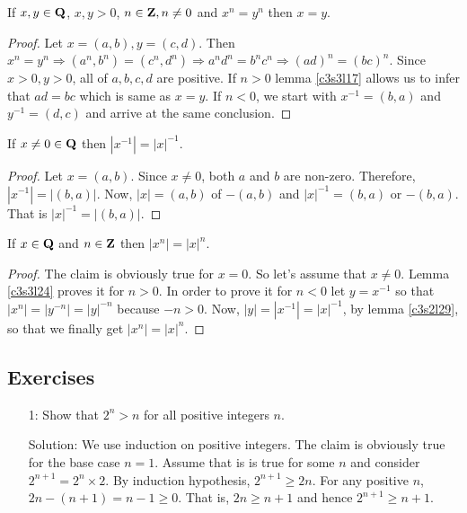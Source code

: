 \begin{lem}\label{c3s3l28}
If $x, y \in \mathbf{Q}$, $x, y > 0$, $n \in \mathbf{Z}, n \ne 0$ and $x^n = y^n$
then $x = y$.
\end{lem}
\begin{proof}
Let $x = (a, b), y = (c, d)$. Then $x^n = y^n \Rightarrow (a^n, b^n) = 
(c^n, d^n) \Rightarrow a^nd^n = b^nc^n \Rightarrow (ad)^n = (bc)^n$. Since
$x > 0, y > 0$, all of $a, b, c, d$ are positive. If $n>0$ lemma 
\ref{c3s3l17} allows us to infer that $ad = bc$ which is same as $x = y$.
If $n < 0$, we start with $x^{-1} = (b, a)$ and $y^{-1} = (d, c)$ and
arrive at the same conclusion.
\end{proof}

\begin{lem}\label{c3s2l29}
If $x \ne 0 \in \mathbf{Q}$ then $|x^{-1}| = |x|^{-1}$.
\end{lem}
\begin{proof}
Let $x = (a, b)$. Since $x \ne 0$, both $a$ and $b$ are non-zero. 
Therefore, $|x^{-1}| = |(b, a)|$. Now, $|x| = (a, b)$ of $-(a, b)$ and
$|x|^{-1} = (b, a)$ or $-(b, a)$. That is $|x|^{-1} = |(b, a)|$.
\end{proof}

\begin{lem}\label{c3s2l30}
If $x \in \mathbf{Q}$ and $n \in \mathbf{Z}$ then $|x^n| = |x|^n$.
\end{lem}
\begin{proof}
The claim is obviously true for $x = 0$. So let's assume that $x \ne 0$.
Lemma \ref{c3s3l24} proves it for $n > 0$. In order to prove it for $n<0$
let $y = x^{-1}$ so that $|x^{n}| = |y^{-n}| = |y|^{-n}$ because $-n > 0$.
Now, $|y| = |x^{-1}| = |x|^{-1}$, by lemma \ref{c3s2l29}, so that we 
finally get $|x^{n}| = |x|^n$.
\end{proof}

\subsection{Exercises}
\begin{enumerate}
\item[1:] Show that $2^n > n$ for all positive integers $n$.
\item[Solution:] We use induction on positive integers. The claim is
obviously true for the base case $n=1$. Assume that is is true for some
$n$ and consider $2^{n+1} = 2^n \times 2$. By induction hypothesis, 
$2^{n+1} \ge 2n$. For any positive $n$, $2n - (n + 1) = n - 1 \ge 0$. 
That is, $2n \ge n + 1$ and hence $2^{n+1} \ge n + 1$.
\end{enumerate}

